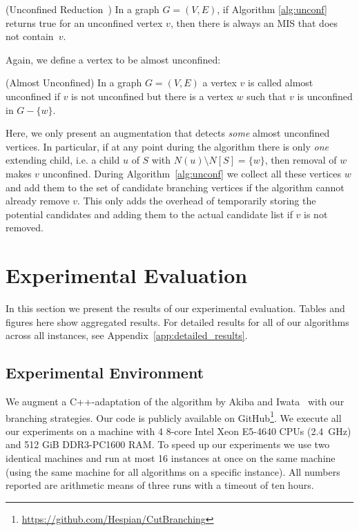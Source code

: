 \documentclass[a4paper,UKenglish,cleveref, autoref, thm-restate]{lipics-v2021}
\begin{document}
\begin{theorem}(Unconfined Reduction~\cite{XiaoUnconfined}) In a graph $G=(V,E)$,
  if Algorithm \ref{alg:unconf} returns true for an unconfined vertex $v$, then
  there is always an MIS that does not contain~$v$.
\end{theorem}

Again, we define a vertex to be almost unconfined:

\begin{definition} (Almost Unconfined)
  In a graph $G=(V,E)$ a vertex $v$ is called almost unconfined if $v$ is not unconfined but there is a vertex $w$ such that $v$ is unconfined in $G-\{w\}$.
\end{definition}

Here, we only present an augmentation that detects \emph{some} almost
unconfined vertices. In particular, if at any point during the algorithm there
is only \emph{one} extending child, i.e. a child $u$ of $S$ with $N(u)\setminus
N[S] = \{w\}$, then removal of $w$ makes $v$ unconfined. During
Algorithm~\ref{alg:unconf} we collect all these vertices $w$ and add them to the
set of candidate branching vertices if the algorithm cannot already remove $v$.
This only adds the overhead of temporarily storing the potential candidates and
adding them to the actual candidate list if $v$ is not removed.


\section{Experimental Evaluation}

In this section we present the results of our experimental evaluation. Tables
and figures here show aggregated results. For
detailed results for all of our algorithms across all instances, see Appendix~\ref{app:detailed_results}.

\subsection{Experimental Environment}
We augment a C++-adaptation of the algorithm by Akiba and
Iwata~\cite{AkibaIwata} with our branching strategies.  Our
code is publicly available on GitHub\footnote{\url{https://github.com/Hespian/CutBranching}}. We execute all our experiments on a machine with 4 8-core Intel Xeon E5-4640 CPUs
(2.4~GHz) and 512 GiB DDR3-PC1600 RAM. To speed up our experiments we use two
identical machines and run at most 16 instances at once on the
same machine (using the same machine for all algorithms on a specific instance).
All numbers reported are arithmetic means of three runs with a timeout of ten
hours.
\end{document}
